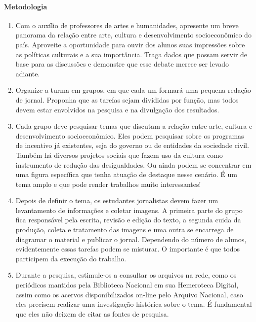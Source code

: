 \documentclass[12pt]{extarticle}
\begin{document}
\paragraph{Metodologia} 
\begin{enumerate}
\item Com o auxílio de professores de artes e humanidades,
apresente um breve panorama da relação entre
arte, cultura e desenvolvimento socioeconômico do país. Aproveite a
oportunidade para ouvir dos alunos suas impressões sobre as políticas
culturais e a sua importância. Traga dados que possam servir de base
para as discussões e demonstre que esse debate merece ser levado
adiante.

\item Organize a turma em grupos, em que cada um formará uma pequena
redação de jornal. Proponha que as tarefas sejam divididas por função,
mas todos devem estar envolvidos na pesquisa e na divulgação dos
resultados.

\item Cada grupo deve pesquisar temas que discutam a relação entre arte,
cultura e desenvolvimento socioeconômico. Eles podem pesquisar sobre os
programas de incentivo já existentes, seja do governo ou de entidades da
sociedade civil. Também há diversos projetos sociais que fazem uso da
cultura como instrumento de redução das desigualdades. Ou ainda podem se
concentrar em uma figura específica que tenha atuação de destaque nesse
cenário. É um tema amplo e que pode render trabalhos muito
interessantes!

\item Depois de definir o tema, os estudantes jornalistas devem fazer um
levantamento de informações e coletar imagens. A primeira parte do grupo
fica responsável pela escrita, revisão e edição do texto, a segunda
cuida da produção, coleta e tratamento das imagens e uma outra se
encarrega de diagramar o material e publicar o jornal. Dependendo do
número de alunos, evidentemente essas tarefas podem se misturar. O
importante é que todos participem da execução do trabalho.

\item Durante a pesquisa, estimule-os a consultar os arquivos na rede, como
os periódicos mantidos pela Biblioteca Nacional em sua Hemeroteca
Digital, assim como os acervos disponibilizados on-line pelo Arquivo
Nacional, caso eles precisem realizar uma investigação histórica sobre o
tema. É fundamental que eles não deixem de citar as fontes de pesquisa.
\end{enumerate}
\end{document}
